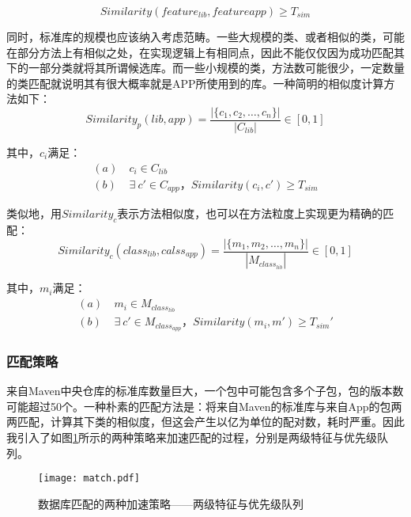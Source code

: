 \begin{equation}
Similarity(feature_{lib},feature{app})\ge T_{sim}
\end{equation}


同时，标准库的规模也应该纳入考虑范畴。一些大规模的类、或者相似的类，可能在部分方法上有相似之处，在实现逻辑上有相同点，因此不能仅仅因为成功匹配其下的一部分类就将其所谓候选库。而一些小规模的类，方法数可能很少，一定数量的类匹配就说明其有很大概率就是APP所使用到的库。一种简明的相似度计算方法如下：
\begin{equation}
Similarity_p(lib,app)=\frac{|\{c_1,c_2,\dots ,c_n\}|}{|C_{lib}|} \in [0,1]
\end{equation}

其中，$c_i$满足：
\begin{subequations}
\begin{align}
(a)&\ c_i \in C_{lib}\\
(b)&\ \exists\  c'\in C_{app}，Similarity(c_i,c')\ge T_{sim}
\end{align}
\end{subequations}


类似地，用$Similarity_c$表示方法相似度，也可以在方法粒度上实现更为精确的匹配：
\begin{equation}
Similarity_c(class_{lib},calss_{app})=\frac{|\{m_1,m_2,\dots ,m_n\}|}{|M_{class_{lib}}|} \in [0,1]
\end{equation}

其中，$m_i$满足：
\begin{subequations}
\begin{align}
(a)&\ m_i \in M_{class_{lib}}\\
(b)&\ \exists\  c'\in M_{class_{app}}，Similarity(m_i,m')\ge T_{sim}'
\end{align}
\end{subequations}



\subsubsection{匹配策略}

来自Maven中央仓库的标准库数量巨大，一个包中可能包含多个子包，包的版本数可能超过50个。一种朴素的匹配方法是：将来自Maven的标准库与来自App的包两两匹配，计算其下类的相似度，但这会产生以亿为单位的配对数，耗时严重。因此我引入了如图\ref{fig:match}所示的两种策略来加速匹配的过程，分别是两级特征与优先级队列。

\begin{figure}[!htp]
  \centering
  \texttt{[image: match.pdf]} \\
  \caption{数据库匹配的两种加速策略——两级特征与优先级队列}
 \label{fig:match}
\end{figure}



